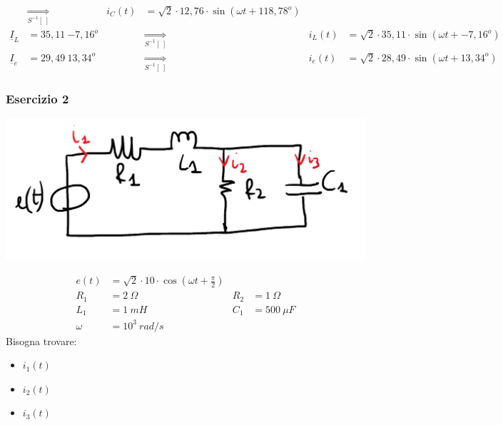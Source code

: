 \documentclass{article}
\begin{document}
\begin{enumerate}[label=\protect\circled{\arabic*}]
\begin{align*}
        &\underset{S^{-1} [\ ]}{\Longrightarrow} &
        i_C(t) &= \sqrt{2} \cdot 12,76 \cdot \sin(\omega t + 118,78 ^o)\\
        \underline{I}_L &= 35,11 \ \boxed{-7,16^o} &
        &\underset{S^{-1} [\ ]}{\Longrightarrow} &
        i_L(t) &= \sqrt{2} \cdot 35,11 \cdot \sin(\omega t + -7,16 ^o)
        \\
        \underline{I}_e &= 29,49 \ \boxed{13,34^o} &
        &\underset{S^{-1} [\ ]}{\Longrightarrow} &
        i_e(t) &= \sqrt{2} \cdot 28,49 \cdot \sin(\omega t + 13,34 ^o)
    \end{align*}
\end{enumerate}


\subsubsection{Esercizio 2}
\begin{center}
    \includegraphics[scale=0.27]{Image/Es_Regime_Sinusoiudale_2.png}
\end{center}
\begin{align*}
    e(t) &= \sqrt{2} \cdot 10 \cdot \cos \left(\omega t + \frac{\pi}{2}\right)\\
    R_1 &= 2 \ \Omega & R_2 &= 1 \ \Omega \\
    L_1 &= 1 \ mH & C_1 &= 500 \ \mu F\\
    \omega &= 10^3 \ rad/s 
\end{align*}
Bisogna trovare:
\begin{itemize}
    \item $i_1(t)$
    \item $i_2(t)$
    \item $i_3(t)$
\end{itemize}
\end{document}
